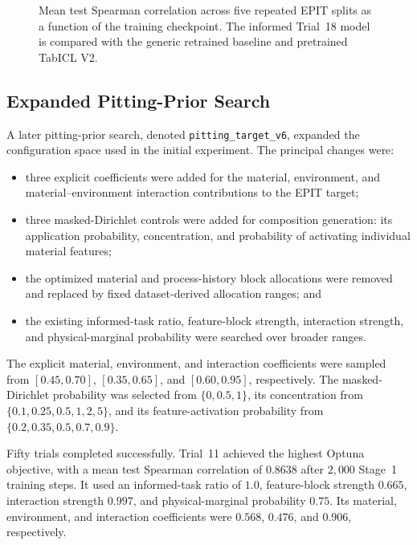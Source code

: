 \documentclass{article}
\begin{document}
\begin{figure}[htbp]
    \centering
    
    \caption{Mean test Spearman correlation across five repeated EPIT splits as a function of the training checkpoint. The informed Trial~18 model is compared with the generic retrained baseline and pretrained TabICL V2.}
    \label{fig:initial-spearman-checkpoints}
\end{figure}

\subsection{Expanded Pitting-Prior Search}
\label{sec:results-expanded-pitting}

A later pitting-prior search, denoted \texttt{pitting\_target\_v6}, expanded the configuration space used in the initial experiment. The principal changes were:

\begin{itemize}
    \item three explicit coefficients were added for the material, environment, and material--environment interaction contributions to the EPIT target;
    \item three masked-Dirichlet controls were added for composition generation: its application probability, concentration, and probability of activating individual material features;
    \item the optimized material and process-history block allocations were removed and replaced by fixed dataset-derived allocation ranges; and
    \item the existing informed-task ratio, feature-block strength, interaction strength, and physical-marginal probability were searched over broader ranges.
\end{itemize}

The explicit material, environment, and interaction coefficients were sampled from \([0.45,0.70]\), \([0.35,0.65]\), and \([0.60,0.95]\), respectively. The masked-Dirichlet probability was selected from \(\{0,0.5,1\}\), its concentration from \(\{0.1,0.25,0.5,1,2,5\}\), and its feature-activation probability from \(\{0.2,0.35,0.5,0.7,0.9\}\).

Fifty trials completed successfully. Trial~11 achieved the highest Optuna objective, with a mean test Spearman correlation of \(0.8638\) after \(2{,}000\) Stage~1 training steps. It used an informed-task ratio of \(1.0\), feature-block strength \(0.665\), interaction strength \(0.997\), and physical-marginal probability \(0.75\). Its material, environment, and interaction coefficients were \(0.568\), \(0.476\), and \(0.906\), respectively.
\end{document}
